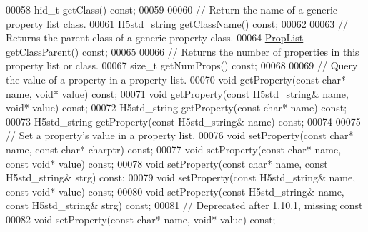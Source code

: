 \begin{DoxyCode}
00058         hid\_t getClass() \textcolor{keyword}{const};
00059 
00060         \textcolor{comment}{// Return the name of a generic property list class.}
00061         H5std\_string getClassName() \textcolor{keyword}{const};
00062 
00063         \textcolor{comment}{// Returns the parent class of a generic property class.}
00064         \hyperlink{class_h5_1_1_prop_list}{PropList} getClassParent() \textcolor{keyword}{const};
00065 
00066         \textcolor{comment}{// Returns the number of properties in this property list or class.}
00067         \textcolor{keywordtype}{size\_t} getNumProps() \textcolor{keyword}{const};
00068 
00069         \textcolor{comment}{// Query the value of a property in a property list.}
00070         \textcolor{keywordtype}{void} getProperty(\textcolor{keyword}{const} \textcolor{keywordtype}{char}* name, \textcolor{keywordtype}{void}* value) \textcolor{keyword}{const};
00071         \textcolor{keywordtype}{void} getProperty(\textcolor{keyword}{const} H5std\_string& name, \textcolor{keywordtype}{void}* value) \textcolor{keyword}{const};
00072         H5std\_string getProperty(\textcolor{keyword}{const} \textcolor{keywordtype}{char}* name) \textcolor{keyword}{const};
00073         H5std\_string getProperty(\textcolor{keyword}{const} H5std\_string& name) \textcolor{keyword}{const};
00074 
00075         \textcolor{comment}{// Set a property's value in a property list.}
00076         \textcolor{keywordtype}{void} setProperty(\textcolor{keyword}{const} \textcolor{keywordtype}{char}* name, \textcolor{keyword}{const} \textcolor{keywordtype}{char}* charptr) \textcolor{keyword}{const};
00077         \textcolor{keywordtype}{void} setProperty(\textcolor{keyword}{const} \textcolor{keywordtype}{char}* name, \textcolor{keyword}{const} \textcolor{keywordtype}{void}* value) \textcolor{keyword}{const};
00078         \textcolor{keywordtype}{void} setProperty(\textcolor{keyword}{const} \textcolor{keywordtype}{char}* name, \textcolor{keyword}{const} H5std\_string& strg) \textcolor{keyword}{const};
00079         \textcolor{keywordtype}{void} setProperty(\textcolor{keyword}{const} H5std\_string& name, \textcolor{keyword}{const} \textcolor{keywordtype}{void}* value) \textcolor{keyword}{const};
00080         \textcolor{keywordtype}{void} setProperty(\textcolor{keyword}{const} H5std\_string& name, \textcolor{keyword}{const} H5std\_string& strg) \textcolor{keyword}{const};
00081         \textcolor{comment}{// Deprecated after 1.10.1, missing const}
00082         \textcolor{keywordtype}{void} setProperty(\textcolor{keyword}{const} \textcolor{keywordtype}{char}* name, \textcolor{keywordtype}{void}* value) \textcolor{keyword}{const};

\end{DoxyCode}
